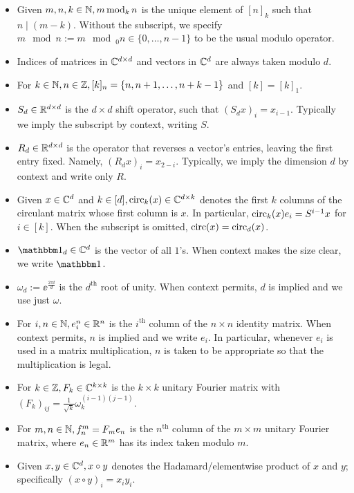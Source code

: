 \begin{itemize}
\item Given $m, n, k \in \mathbb{N}, m \operatorname{\mathbin{mod}}_k n$ is the unique element of $[n]_k$ such that $n \mid (m - k)$.  Without the subscript, we specify $m \mod n := m \mod_0 n \in \{0, \ldots, n - 1\}$ to be the usual modulo operator.
\item Indices of matrices in $\mathbb{C}^{d \times d}$ and vectors in $\mathbb{C}^d$ are always taken modulo $d$.
\item For $k \in \mathbb{N}, n \in \mathbb{Z}, [k]_n = \{n, n + 1, \ldots, n + k - 1\}$ and $[k] = [k]_1$.
\item $S_d \in \mathbb{R}^{d \times d}$ is the $d \times d$ shift operator, such that $(S_d x)_i = x_{i - 1}$.  Typically we imply the subscript by context, writing $S$.
\item $R_d \in \mathbb{R}^{d \times d}$ is the operator that reverses a vector's entries, leaving the first entry fixed.  Namely, $(R_d x)_i = x_{2 - i}$.  Typically, we imply the dimension $d$ by context and write only $R$.
\item Given $x \in \mathbb{C}^d$ and $k \in [d], \operatorname{circ}_k(x) \in \mathbb{C}^{d \times k}$ denotes the first $k$ columns of the circulant matrix whose first column is $x$.  In particular, $\operatorname{circ}_k(x) e_i = S^{i - 1} x$ for $i \in [k]$.  When the subscript is omitted, $\operatorname{circ}(x) = \operatorname{circ}_d(x)$.
  \item $\one_d \in \C^d$ is the vector of all $1$'s.  When context makes the size clear, we write $\one$.
\item $\omega_d := \ee^{\frac{2 \pi \ii}{d}}$ is the $d^{\text{th}}$ root of unity.  When context permits, $d$ is implied and we use just $\omega$.
  \item For $i, n \in \mathbb{N}, e_i^n \in \mathbb{R}^n$ is the $i^{\text{th}}$ column of the $n \times n$ identity matrix.  When context permits, $n$ is implied and we write $e_i$.  In particular, whenever $e_i$ is used in a matrix multiplication, $n$ is taken to be appropriate so that the multiplication is legal.
\item For $k \in \mathbb{Z}, F_k \in \mathbb{C}^{k \times k}$ is the $k \times k$ unitary Fourier matrix with $(F_k)_{ij} = \frac{1}{\sqrt{k}} \omega_k^{(i-1)(j-1)}$.
  \item For $m, n \in \mathbb{N}, f_n^m = F_m e_n$ is the $n^{\text{th}}$ column of the $m \times m$ unitary Fourier matrix, where $e_n \in \mathbb{R}^m$ has its index taken modulo $m$.
\item Given $x, y \in \mathbb{C}^d, x \circ y$ denotes the Hadamard/elementwise product of $x$ and $y$; specifically $(x \circ y)_i = x_i y_i$.

\end{itemize}
